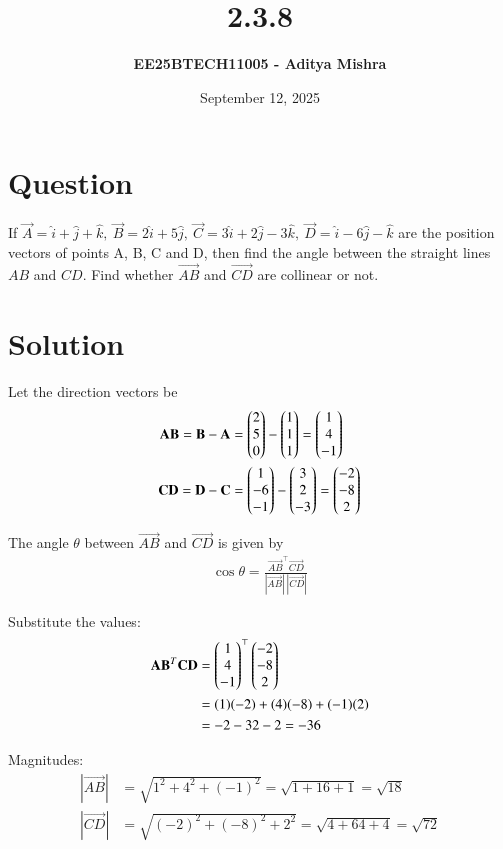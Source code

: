 \documentclass[12pt]{article}
\title{\textbf{2.3.8}}
\author{\textbf{EE25BTECH11005 - Aditya Mishra}}
\date{September 12, 2025}
\begin{document}
\maketitle
\section*{Question}
If $ \vec{A} = \hat{i} + \hat{j} + \hat{k},\ \vec{B} = 2\hat{i} + 5\hat{j},\ \vec{C} = 3\hat{i} + 2\hat{j} - 3\hat{k},\ \vec{D} = \hat{i} - 6\hat{j} - \hat{k}$ are the position vectors of points A, B, C and D, then find the angle between the straight lines $AB$ and $CD$. Find whether $\vec{AB}$ and $\vec{CD}$ are collinear or not.

\section*{Solution}
Let the direction vectors be
\begin{align}
\mathbf{AB} = \mathbf{B} - \mathbf{A} &= \begin{pmatrix}2\\5\\0\end{pmatrix} - \begin{pmatrix}1\\1\\1\end{pmatrix} = \begin{pmatrix}1\\4\\-1\end{pmatrix} \\
\mathbf{CD} = \mathbf{D} - \mathbf{C} &= \begin{pmatrix}1\\-6\\-1\end{pmatrix} - \begin{pmatrix}3\\2\\-3\end{pmatrix} = \begin{pmatrix}-2\\-8\\2\end{pmatrix}
\end{align}

The angle $\theta$ between $\vec{AB}$ and $\vec{CD}$ is given by
\begin{align}
\cos\theta = \frac{\vec{AB}^\top \vec{CD}}{|\vec{AB}|\,|\vec{CD}|}
\end{align}

Substitute the values:
\begin{align}
\mathbf{AB}^T \mathbf{CD} &= \begin{pmatrix}1\\4\\-1\end{pmatrix}^\top \begin{pmatrix}-2\\-8\\2\end{pmatrix} \\
&= (1)(-2) + (4)(-8) + (-1)(2) \\
&= -2 - 32 - 2 = -36 
\end{align}

Magnitudes:
\begin{align}
|\vec{AB}| &= \sqrt{1^2 + 4^2 + (-1)^2} = \sqrt{1 + 16 + 1} = \sqrt{18} \\
|\vec{CD}| &= \sqrt{(-2)^2 + (-8)^2 + 2^2} = \sqrt{4 + 64 + 4} = \sqrt{72}
\end{align}
\end{document}
